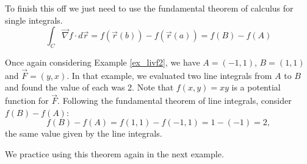 To finish this off we just need to use the fundamental theorem of calculus for single integrals.
$$
\int_C{{\vec{\nabla} f\cdot d\vec r}} = f\left( {\vec r\left( b \right)} \right) - f\left( {\vec r\left( a \right)} \right)=f(B)-f(A)
$$
\fi

Once again considering Example \ref{ex_livf2}, we have $A = (-1,1)$, $B = (1,1)$ and $\vec F = \left( y,x\right)$. In that example, we evaluated two line integrals from $A$ to $B$ and found the value of each was 2. Note that $f(x,y) = xy$ is a potential function for $\vec F$. Following the fundamental theorem of line integrals, consider $f(B) - f(A)$:
$$f(B) - f(A) = f(1,1) - f(-1,1) = 1 - (-1) = 2,$$
the same value given by the line integrals.


We practice using this theorem again in the next example.

